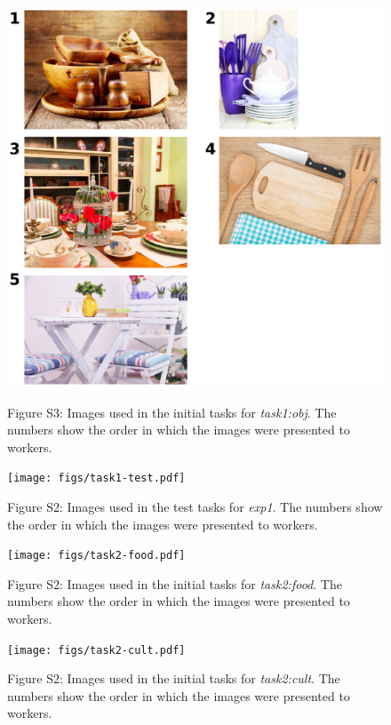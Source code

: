 \documentclass[12pt]{article}
\begin{document}
\begin{figure}
	\includegraphics{figs/task1-obj.pdf}
	\label{fig:task1:obj}
	\caption{
		Figure S3: Images used in the initial tasks for 
		\textit{task1:obj}.  The numbers show the order in which the 
		images were presented to workers.
	}
\end{figure}

\begin{figure}
	\texttt{[image: figs/task1-test.pdf]}
	\label{fig:task1:test}
	\caption{
		Figure S2: Images used in the test tasks for 
		\textit{exp1}.  The numbers show the order in which the 
		images were presented to workers.
	}
\end{figure}

\begin{figure}
	\texttt{[image: figs/task2-food.pdf]}
	\label{fig:task2:food}
	\caption{
		Figure S2: Images used in the initial tasks for 
		\textit{task2:food}.  The numbers show the order in which the 
		images were presented to workers.
	}
\end{figure}

\begin{figure}
	\texttt{[image: figs/task2-cult.pdf]}
	\label{fig:task2:cult}
	\caption{
		Figure S2: Images used in the initial tasks for 
		\textit{task2:cult}.  The numbers show the order in which the 
		images were presented to workers.
	}
\end{figure}
\end{document}
